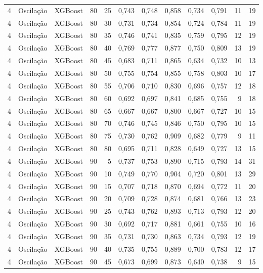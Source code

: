 \begin{longtable}{ccclrrrrrrrr}
4 & Oscilação & XGBoost & 80 & 25 & 0,743 & 0,748 & 0,858 & 0,734 & 0,791 & 11 & 19 \\
4 & Oscilação & XGBoost & 80 & 30 & 0,731 & 0,734 & 0,854 & 0,724 & 0,784 & 11 & 19 \\
4 & Oscilação & XGBoost & 80 & 35 & 0,746 & 0,741 & 0,835 & 0,759 & 0,795 & 12 & 19 \\
4 & Oscilação & XGBoost & 80 & 40 & 0,769 & 0,777 & 0,877 & 0,750 & 0,809 & 13 & 19 \\
4 & Oscilação & XGBoost & 80 & 45 & 0,683 & 0,711 & 0,865 & 0,634 & 0,732 & 10 & 13 \\
4 & Oscilação & XGBoost & 80 & 50 & 0,755 & 0,754 & 0,855 & 0,758 & 0,803 & 10 & 17 \\
4 & Oscilação & XGBoost & 80 & 55 & 0,706 & 0,710 & 0,830 & 0,696 & 0,757 & 12 & 18 \\
4 & Oscilação & XGBoost & 80 & 60 & 0,692 & 0,697 & 0,841 & 0,685 & 0,755 & 9 & 18 \\
4 & Oscilação & XGBoost & 80 & 65 & 0,667 & 0,667 & 0,800 & 0,667 & 0,727 & 10 & 15 \\
4 & Oscilação & XGBoost & 80 & 70 & 0,746 & 0,745 & 0,846 & 0,750 & 0,795 & 10 & 15 \\
4 & Oscilação & XGBoost & 80 & 75 & 0,730 & 0,762 & 0,909 & 0,682 & 0,779 & 9 & 11 \\
4 & Oscilação & XGBoost & 80 & 80 & 0,695 & 0,711 & 0,828 & 0,649 & 0,727 & 13 & 15 \\
4 & Oscilação & XGBoost & 90 & 5 & 0,737 & 0,753 & 0,890 & 0,715 & 0,793 & 14 & 31 \\
4 & Oscilação & XGBoost & 90 & 10 & 0,749 & 0,770 & 0,904 & 0,720 & 0,801 & 13 & 29 \\
4 & Oscilação & XGBoost & 90 & 15 & 0,707 & 0,718 & 0,870 & 0,694 & 0,772 & 11 & 20 \\
4 & Oscilação & XGBoost & 90 & 20 & 0,709 & 0,728 & 0,874 & 0,681 & 0,766 & 13 & 23 \\
4 & Oscilação & XGBoost & 90 & 25 & 0,743 & 0,762 & 0,893 & 0,713 & 0,793 & 12 & 20 \\
4 & Oscilação & XGBoost & 90 & 30 & 0,692 & 0,717 & 0,881 & 0,661 & 0,755 & 10 & 16 \\
4 & Oscilação & XGBoost & 90 & 35 & 0,731 & 0,730 & 0,863 & 0,734 & 0,793 & 12 & 19 \\
4 & Oscilação & XGBoost & 90 & 40 & 0,735 & 0,755 & 0,889 & 0,700 & 0,783 & 12 & 17 \\
4 & Oscilação & XGBoost & 90 & 45 & 0,673 & 0,699 & 0,873 & 0,640 & 0,738 & 9 & 15 \\

\end{longtable}
